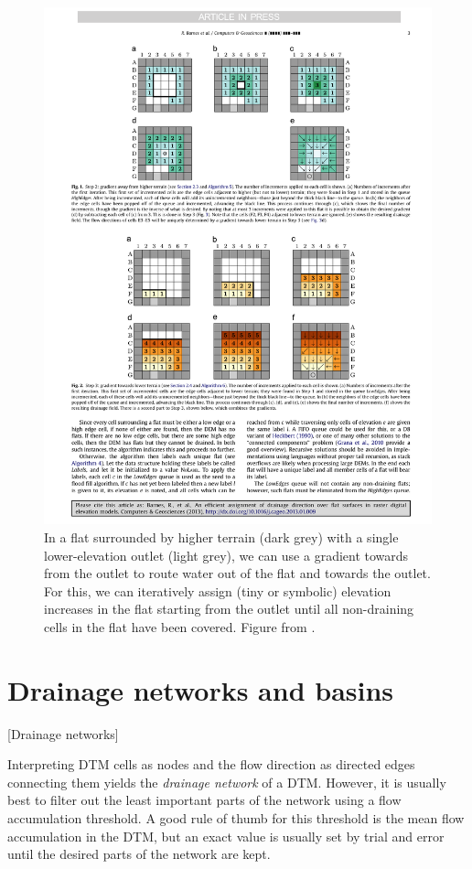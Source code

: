 \begin{figure}[htbp]
\centering
\includegraphics[width=1.0\linewidth]{figs/lt.pdf}
\caption{In a flat surrounded by higher terrain (dark grey) with a single lower-elevation outlet (light grey), we can use a gradient towards from the outlet to route water out of the flat and towards the outlet.
For this, we can iteratively assign (tiny or symbolic) elevation increases in the flat starting from the outlet until all non-draining cells in the flat have been covered.
Figure from \citet{Barnes14}.}%
\label{fig:lt}
\end{figure}


\section{Drainage networks and basins}[Drainage networks]%
\label{sec:drainage_basins}


Interpreting DTM cells as nodes and the flow direction as directed edges connecting them yields the \emph{drainage network} of a DTM\@.
However, it is usually best to filter out the least important parts of the network using a flow accumulation threshold.
A good rule of thumb for this threshold is the mean flow accumulation in the DTM, but an exact value is usually set by trial and error until the desired parts of the network are kept.

